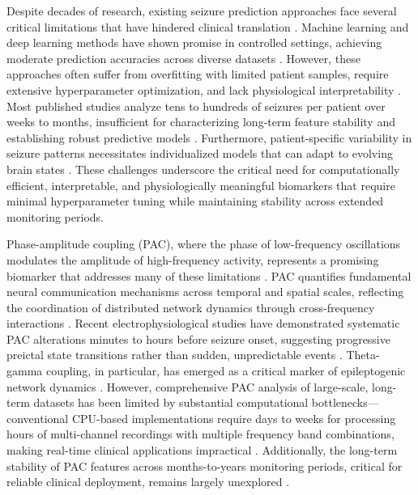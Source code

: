 Despite decades of research, existing seizure prediction approaches face several critical limitations that have hindered clinical translation \cite{Natu2022ReviewOEB,Talukder2023ComparativeAOM}. Machine learning and deep learning methods have shown promise in controlled settings, achieving moderate prediction accuracies across diverse datasets \cite{Truong2021SeizureSPV,Dissanayake2020PatientindependentESY,KiralKornek2017EpilepticSPW,Messaoud2021RandomFCR}. However, these approaches often suffer from overfitting with limited patient samples, require extensive hyperparameter optimization, and lack physiological interpretability \cite{Usman2017EpilepticSPH,Hussein2022MultiChannelVTE}. Most published studies analyze tens to hundreds of seizures per patient over weeks to months, insufficient for characterizing long-term feature stability and establishing robust predictive models \cite{Kuhlmann2018SeizurePA,DAlessandro2003EpilepticSPQ}. Furthermore, patient-specific variability in seizure patterns necessitates individualized models that can adapt to evolving brain states \cite{Aldahr2023PatientSpecificPPL,Pinto2021APAP}. These challenges underscore the critical need for computationally efficient, interpretable, and physiologically meaningful biomarkers that require minimal hyperparameter tuning while maintaining stability across extended monitoring periods.

Phase-amplitude coupling (PAC), where the phase of low-frequency oscillations modulates the amplitude of high-frequency activity, represents a promising biomarker that addresses many of these limitations \cite{Tort2010MeasuringPCE,Canolty2010TheFRC}. PAC quantifies fundamental neural communication mechanisms across temporal and spatial scales, reflecting the coordination of distributed network dynamics through cross-frequency interactions \cite{Aru2014UntanglingCCD,Hlsemann2019QuantificationOPA}. Recent electrophysiological studies have demonstrated systematic PAC alterations minutes to hours before seizure onset, suggesting progressive preictal state transitions rather than sudden, unpredictable events \cite{Kapoor2022EpilepticSPJ,Detti2020EEGSAC,Zhang2017TemporalspatialCOAG,Miao2021SeizureOZBG}. Theta-gamma coupling, in particular, has emerged as a critical marker of epileptogenic network dynamics \cite{Ahn2022TheFIT,Radiske2020CrossFrequencyPCAR,Ponzi2023ThetagammaPAAT}. However, comprehensive PAC analysis of large-scale, long-term datasets has been limited by substantial computational bottlenecks—conventional CPU-based implementations require days to weeks for processing hours of multi-channel recordings with multiple frequency band combinations, making real-time clinical applications impractical \cite{Combrisson2020TensorpacAOAH,MartnezCancino2020ComputingPABK}. Additionally, the long-term stability of PAC features across months-to-years monitoring periods, critical for reliable clinical deployment, remains largely unexplored \cite{Rakowska2021LongTEQ}.

